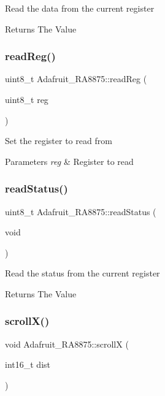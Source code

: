 Read the data from the current register

\begin{DoxyReturn}{Returns}
The Value 
\end{DoxyReturn}
\mbox{\label{class_adafruit___r_a8875_acff25414ab909c1c2dc7b5bf505fb2cf}} 
\subsubsection{\texorpdfstring{readReg()}{readReg()}}
{\footnotesize\ttfamily uint8\+\_\+t Adafruit\+\_\+\+R\+A8875\+::read\+Reg (\begin{DoxyParamCaption}\item[{uint8\+\_\+t}]{reg }\end{DoxyParamCaption})}

Set the register to read from


\begin{DoxyParams}{Parameters}
{\em reg} & Register to read \\
\hline
\end{DoxyParams}
\mbox{\label{class_adafruit___r_a8875_a6bc685b64b6cce6480af2054e7cabc14}} 
\subsubsection{\texorpdfstring{readStatus()}{readStatus()}}
{\footnotesize\ttfamily uint8\+\_\+t Adafruit\+\_\+\+R\+A8875\+::read\+Status (\begin{DoxyParamCaption}\item[{void}]{ }\end{DoxyParamCaption})}

Read the status from the current register

\begin{DoxyReturn}{Returns}
The Value 
\end{DoxyReturn}
\mbox{\label{class_adafruit___r_a8875_af4d86322451340de27f59de67ae3a145}} 
\subsubsection{\texorpdfstring{scrollX()}{scrollX()}}
{\footnotesize\ttfamily void Adafruit\+\_\+\+R\+A8875\+::scrollX (\begin{DoxyParamCaption}\item[{int16\+\_\+t}]{dist }\end{DoxyParamCaption})}

